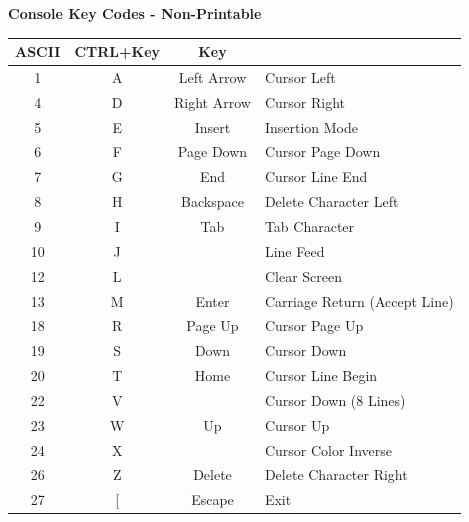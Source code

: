 \documentclass[12pt]{article}
\newcommand{\HeaderCenter}[1] {\makecell[tc]{\textbf{#1}}}
\begin{document}
\begin{table}[h]
\centering\textbf{Console Key Codes - Non-Printable}                              \\
\begin{tabular}{ | c | c | c | l | }                                                 \hline
\textbf{ASCII} & \textbf{CTRL+Key} & \textbf{Key} & \HeaderCenter{Output}         \\ \hline
1              & A                 & Left Arrow   & Cursor Left                   \\ \hline
4              & D                 & Right Arrow  & Cursor Right                  \\ \hline
5              & E                 & Insert       & Insertion Mode                \\ \hline
6              & F                 & Page Down    & Cursor Page Down              \\ \hline
7              & G                 & End          & Cursor Line End               \\ \hline
8              & H                 & Backspace    & Delete Character Left         \\ \hline
9              & I                 & Tab          & Tab Character                 \\ \hline
10             & J                 &              & Line Feed                     \\ \hline
12             & L                 &              & Clear Screen                  \\ \hline
13             & M                 & Enter        & Carriage Return (Accept Line) \\ \hline
18             & R                 & Page Up      & Cursor Page Up                \\ \hline
19             & S                 & Down         & Cursor Down                   \\ \hline
20             & T                 & Home         & Cursor Line Begin             \\ \hline
22             & V                 &              & Cursor Down (8 Lines)         \\ \hline
23             & W                 & Up           & Cursor Up                     \\ \hline
24             & X                 &              & Cursor Color Inverse          \\ \hline
26             & Z                 & Delete       & Delete Character Right        \\ \hline
27             & [                 & Escape       & Exit                          \\ \hline
\end{tabular}
\end{table}
\end{document}
